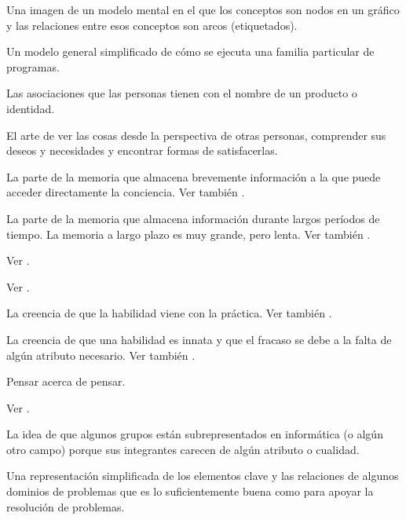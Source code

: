 \begin{description}
 Una imagen de un modelo mental en el que
los conceptos son nodos en un gráfico y las relaciones entre esos conceptos son arcos (etiquetados).

 Un modelo general simplificado de cómo se ejecuta una familia particular de programas.

 Las asociaciones que las personas tienen con el nombre de un producto o
identidad.

 El arte de ver las cosas desde la perspectiva
de otras personas, comprender sus deseos y necesidades y encontrar
formas de satisfacerlas.

 La parte de la memoria que almacena brevemente información a la que 
puede acceder directamente la conciencia. Ver también .

 La parte de la memoria que
almacena información durante largos períodos de tiempo. La memoria a largo plazo es muy grande,
pero lenta. Ver también .

 Ver .

 Ver .

 La creencia de que la habilidad
viene con la práctica. Ver también .

 La creencia de que una habilidad es innata y que
el fracaso se debe a la falta de algún atributo necesario. Ver también
.

 Pensar acerca de pensar.

 Ver .

 La idea de que algunos grupos
están subrepresentados en informática (o algún otro campo) porque sus integrantes
carecen de algún atributo o cualidad.

 Una representación simplificada
de los elementos clave y las relaciones de algunos dominios de problemas que es
lo suficientemente buena como para apoyar la resolución de problemas.


\end{description}
